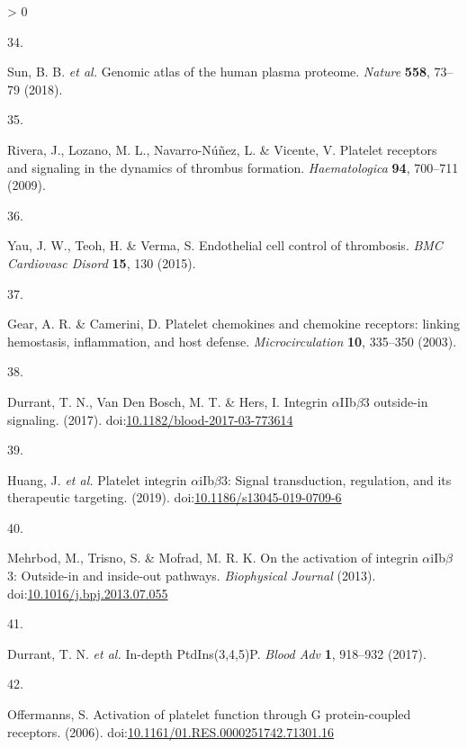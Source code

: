 \documentclass[11pt,twoside]{bristolthesis}
\newlength{\cslhangindent}
\newlength{\csllabelwidth}
\newenvironment{CSLReferences}[2] %
 {%
  \setlength{\parindent}{0pt}
  \ifodd #1 \everypar{\setlength{\hangindent}{\cslhangindent}}\ignorespaces\fi
  \ifnum #2 > 0
  \setlength{\parskip}{#2\baselineskip}
  \fi
 }%
 {}
\newcommand{\CSLLeftMargin}[1]{\parbox[t]{\csllabelwidth}{#1}}
\newcommand{\CSLRightInline}[1]{\parbox[t]{\linewidth - \csllabelwidth}{#1}\break}
\begin{document}
\begin{CSLReferences}{0}{0}
\leavevmode\hypertarget{ref-Sun2018}{}%
\CSLLeftMargin{34. }
\CSLRightInline{Sun, B. B. \emph{et al.} {Genomic atlas of the human plasma proteome}. \emph{Nature} \textbf{558}, 73--79 (2018).}

\leavevmode\hypertarget{ref-Rivera2009}{}%
\CSLLeftMargin{35. }
\CSLRightInline{Rivera, J., Lozano, M. L., Navarro-Núñez, L. \& Vicente, V. {Platelet receptors and signaling in the dynamics of thrombus formation}. \emph{Haematologica} \textbf{94}, 700--711 (2009).}

\leavevmode\hypertarget{ref-Yau2015}{}%
\CSLLeftMargin{36. }
\CSLRightInline{Yau, J. W., Teoh, H. \& Verma, S. {Endothelial cell control of thrombosis}. \emph{BMC Cardiovasc Disord} \textbf{15}, 130 (2015).}

\leavevmode\hypertarget{ref-Gear2003}{}%
\CSLLeftMargin{37. }
\CSLRightInline{Gear, A. R. \& Camerini, D. {Platelet chemokines and chemokine receptors: linking hemostasis, inflammation, and host defense}. \emph{Microcirculation} \textbf{10}, 335--350 (2003).}

\leavevmode\hypertarget{ref-Durrant2017a}{}%
\CSLLeftMargin{38. }
\CSLRightInline{Durrant, T. N., Van Den Bosch, M. T. \& Hers, I. {Integrin \(\alpha\)IIb\(\beta\)3 outside-in signaling}. (2017). doi:\href{https://doi.org/10.1182/blood-2017-03-773614}{10.1182/blood-2017-03-773614}}

\leavevmode\hypertarget{ref-Huang2019}{}%
\CSLLeftMargin{39. }
\CSLRightInline{Huang, J. \emph{et al.} {Platelet integrin \(\alpha\)iIb\(\beta\)3: Signal transduction, regulation, and its therapeutic targeting}. (2019). doi:\href{https://doi.org/10.1186/s13045-019-0709-6}{10.1186/s13045-019-0709-6}}

\leavevmode\hypertarget{ref-Mehrbod2013}{}%
\CSLLeftMargin{40. }
\CSLRightInline{Mehrbod, M., Trisno, S. \& Mofrad, M. R. K. {On the activation of integrin \(\alpha\)iIb\(\beta\)3: Outside-in and inside-out pathways}. \emph{Biophysical Journal} (2013). doi:\href{https://doi.org/10.1016/j.bpj.2013.07.055}{10.1016/j.bpj.2013.07.055}}

\leavevmode\hypertarget{ref-Durrant2017}{}%
\CSLLeftMargin{41. }
\CSLRightInline{Durrant, T. N. \emph{et al.} {In-depth PtdIns(3,4,5)P}. \emph{Blood Adv} \textbf{1}, 918--932 (2017).}

\leavevmode\hypertarget{ref-Offermanns2006}{}%
\CSLLeftMargin{42. }
\CSLRightInline{Offermanns, S. {Activation of platelet function through G protein-coupled receptors}. (2006). doi:\href{https://doi.org/10.1161/01.RES.0000251742.71301.16}{10.1161/01.RES.0000251742.71301.16}}


\end{CSLReferences}
\end{document}

